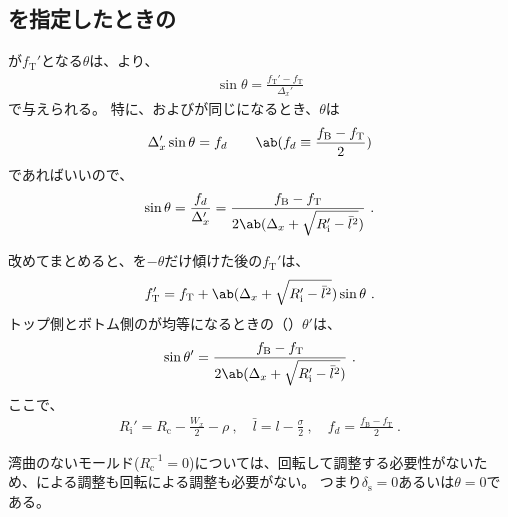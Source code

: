 \subsection{\AlocationLength を指定したときの\AlocationAngle}
\TopAlocationLength が$f_\mathrm T'$となる\AlocationAngle$\theta$は、より、
\begin{align}
  \label{eq:alocationangle}
  \sin\theta = \frac{f_\mathrm T'-f_\mathrm T}{\Delta_x'}
\end{align}
で与えられる。
特に、\TopAlocationLength および\BottomAlocationLength が同じになるとき、$\theta$は
\begin{align*}
  \Delta_x'\sin\theta = f_d \qquad \ab(f_d \equiv \frac{f_\mathrm B-f_\mathrm T}2)
\end{align*}
であればいいので、
\begin{align}
  \label{eq:equalalocationangle}
  \sin\theta = \frac{f_d}{\Delta_x'}
  = \frac{f_\mathrm B-f_\mathrm T}{2\ab(\Delta_x+\sqrt{R_\mathrm i'-\bar l^2})}~.
\end{align}
\begin{hosoku}
改めてまとめると、\Table を$-\theta$だけ傾けた後の\TopReAlocationLength$f_\mathrm T'$は、
\begin{align*}
  f_\mathrm T' = f_\mathrm T+\ab(\Delta_x+\sqrt{R_\mathrm i'-\bar l^2})\sin\theta\ .
\end{align*}
トップ側とボトム側の\AlocationLength が均等になるときの\AlocationAngle（\textbf{\EqualAlocationAngle}）$\theta'$は、
\begin{align*}
  \sin\theta' = \frac{f_\mathrm B-f_\mathrm T}{2\ab(\Delta_x+\sqrt{R_\mathrm i'-\bar l^2})}\ .
\end{align*}
ここで、
\begin{align*}
  R_\mathrm i' = R_\mathrm c-\frac{W_x}2-\rho\ ,\quad
  \bar l = l-\frac\sigma2\ ,\quad
  f_d = \frac{f_\mathrm B-f_\mathrm T}2\ .
\end{align*}
\end{hosoku}



湾曲のないモールド($R_\mathrm c^{-1}= 0$)については、回転して調整する必要性がないため、\Spacer による調整も回転による調整も必要がない。
つまり$\delta_\mathrm s = 0$あるいは$\theta = 0$である。

